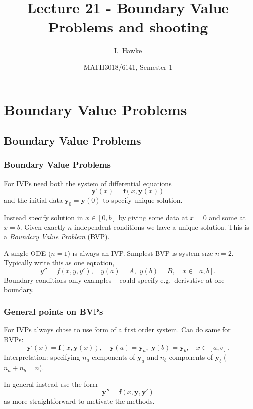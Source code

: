 \documentclass{beamer}
\title[Lecture 21] %
{Lecture 21 - Boundary Value Problems and shooting}
\author[I. Hawke] %
{I.~Hawke}
\institute[University of Southampton] %
{
  School of Mathematics, \\
  University of Southampton, UK
}
\date[Semester 1] %
{MATH3018/6141, Semester 1}
\newcommand{\by}{{\boldsymbol{y}}}
\newcommand{\bfm}[1]{{\boldsymbol{#1}}}
\begin{document}
\begin{frame}
  \titlepage
\end{frame}

\section{Boundary Value Problems}

\subsection{Boundary Value Problems}

\begin{frame}
  \frametitle{Boundary Value Problems}

  For IVPs need both the system of differential equations
  \begin{equation*}
    \by'(x) = \bfm{f}(x, \by(x))
  \end{equation*}
  and the initial data $\by_0 = \by(0)$ to specify unique solution. \pause

  \vspace{1ex}

  Instead specify solution in $x \in [0, b]$ by giving some data at
  $x=0$ and some at $x=b$. Given exactly $n$ independent conditions we have
  a unique solution. This is a \emph{Boundary Value Problem}
  (BVP). \pause

  \vspace{1ex}

  A single ODE ($n=1$) is always an IVP.  Simplest BVP is system size
  $n=2$. Typically write this as one equation,
  \begin{equation*}
    y'' = f(x, y, y'), \quad y(a) = A, \,\, y(b) = B, \quad x \in [a,b].
  \end{equation*} \pause
  Boundary conditions only examples -- could specify e.g.\
  derivative at one boundary.

\end{frame}

\begin{frame}
  \frametitle{General points on BVPs}

  For IVPs always chose to use form of a first order system.  Can do
  same for BVPs:
  \begin{equation*}
    \by'(x) = \bfm{f}(x, \by(x)), \quad \by(a) = \by_a, \,\,\by(b) =
    \by_b, \quad x \in [a,b].
  \end{equation*}
  Interpretation: specifying $n_a$ components of $\by_a$ and $n_b$
  components of $\by_b$ ($n_a + n_b = n$). \pause

  \vspace{1ex}

  In general instead use the form
  \begin{equation*}
    \by'' = \bfm{f} \left( x, \by, \by' \right)
  \end{equation*}
  as more straightforward to motivate the methods.

\end{frame}
\end{document}
